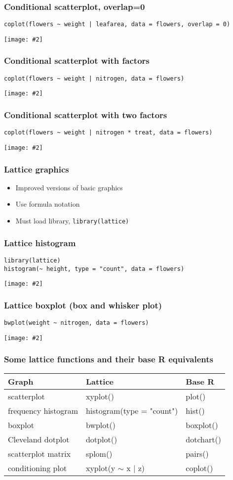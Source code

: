 \documentclass{beamer}
\newcommand{\bi}{\begin{itemize}}
\newcommand{\li}{\item}
\newcommand{\ei}{\end{itemize}}
\newcommand{\fig}[2]{\centerline{\texttt{[image: \#2]}}}
\newcommand{\bfr}[1]{\begin{frame}[fragile]\frametitle{{ #1 }}}
\begin{document}
\bfr{Conditional scatterplot, overlap=0}
{\scriptsize
\begin{verbatim}
coplot(flowers ~ weight | leafarea, data = flowers, overlap = 0)
\end{verbatim}
}
\fig{1}{plot27-1.png}
\end{frame}

\bfr{Conditional scatterplot with factors}
{\scriptsize
\begin{verbatim}
coplot(flowers ~ weight | nitrogen, data = flowers)
\end{verbatim}
}
\fig{1}{plot28-1.png}
\end{frame}

\bfr{Conditional scatterplot with two factors}
{\scriptsize
\begin{verbatim}
coplot(flowers ~ weight | nitrogen * treat, data = flowers)
\end{verbatim}
}
\fig{1}{plot29-1.png}
\end{frame}


\bfr{Lattice graphics}
\bi
\li Improved versions of basic graphics
\li Use formula notation
\li Must load library, {\tt library(lattice)}
\ei
\end{frame}

\bfr{Lattice histogram}
{\scriptsize
\begin{verbatim}
library(lattice)
histogram(~ height, type = "count", data = flowers)
\end{verbatim}
}
\fig{.8}{plot31-1.png}
\end{frame}



\bfr{Lattice boxplot (box and whisker plot)}
{\scriptsize
\begin{verbatim}
bwplot(weight ~ nitrogen, data = flowers)
\end{verbatim}
}
\fig{.8}{plot32-1.png}
\end{frame}

\bfr{Some lattice functions and their base R equivalents}
\begin{tabular}{lll}
Graph & Lattice & Base R \\\hline
scatterplot	&xyplot()&	plot()\\
frequency histogram	&histogram(type = "count")	&hist()\\
boxplot&	bwplot()	&boxplot()\\
Cleveland dotplot&	dotplot()&	dotchart()\\
scatterplot matrix&	splom()&	pairs()\\
conditioning plot	&xyplot(y $\sim$ x | z)	&coplot()
\end{tabular}
\end{frame}
\end{document}
